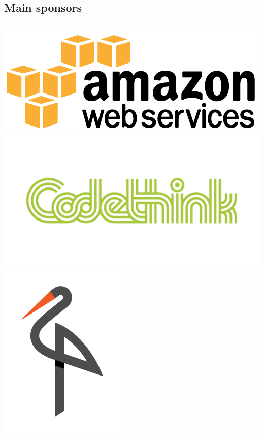 \documentclass[t]{beamer}
\begin{document}
\subsection{Main sponsors}


\begin{frame}
	\begin{columns}[t]
	\centering
		\includegraphics[scale=0.1]{images/aws.png}\\
		\includegraphics[scale=0.2]{images/codethink.png}\\
		\includegraphics[scale=0.25]{images/minio.png}

\end{columns}
\end{frame}
\end{document}
